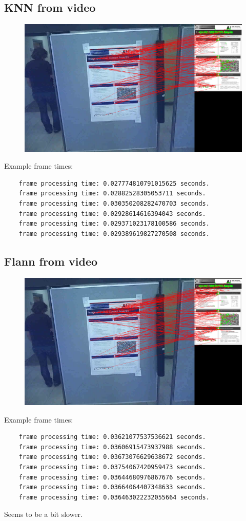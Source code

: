 \documentclass{article}
\begin{document}
\subsection{KNN from video}
  \begin{figure}[h]
      \centering
      \includegraphics[scale=0.28]{knn_video}
  \end{figure}
  Example frame times:
  \begin{verbatim}
    frame processing time: 0.027774810791015625 seconds.
    frame processing time: 0.02882528305053711 seconds.
    frame processing time: 0.030350208282470703 seconds.
    frame processing time: 0.02928614616394043 seconds.
    frame processing time: 0.029371023178100586 seconds.
    frame processing time: 0.029389619827270508 seconds.
  \end{verbatim}

\subsection{Flann from video}
  \begin{figure}[h]
      \centering
      \includegraphics[scale=0.28]{flann}
  \end{figure}
  Example frame times:
  \begin{verbatim}
    frame processing time: 0.03621077537536621 seconds.
    frame processing time: 0.03606915473937988 seconds.
    frame processing time: 0.03673076629638672 seconds.
    frame processing time: 0.03754067420959473 seconds.
    frame processing time: 0.03644680976867676 seconds.
    frame processing time: 0.03664064407348633 seconds.
    frame processing time: 0.036463022232055664 seconds.
  \end{verbatim}
  Seems to be a bit slower.
\end{document}
